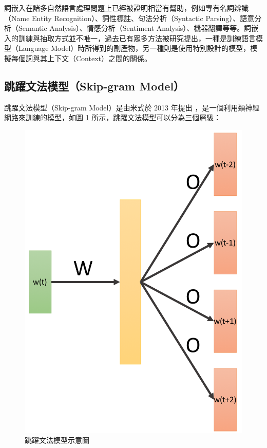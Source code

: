 詞嵌入在諸多自然語言處理問題上已經被證明相當有幫助，例如專有名詞辨識（Name Entity Recognition）、詞性標註、句法分析（Syntactic Parsing）、語意分析（Semantic Analysis）、情感分析（Sentiment Analysis）、機器翻譯等等。詞嵌入的訓練與抽取方式並不唯一，過去已有眾多方法被研究提出，一種是訓練語言模型（Language Model）時所得到的副產物，另一種則是使用特別設計的模型，模擬每個詞與其上下文（Context）之間的關係。%
\subsection{跳躍文法模型（Skip-gram Model）}
跳躍文法模型（Skip-gram Model）是由米式於 2013 年提出 \cite{mikolov2013efficient} \cite{mikolov2013distributed} ，是一個利用類神經網路來訓練的模型，如圖 \ref{fig:skip_gram} 所示，跳躍文法模型可以分為三個層級：
\begin{figure}[h]
    \centering
    \includegraphics[scale=0.35]{images/chap2_skipgram.png}
    \caption{跳躍文法模型示意圖 \cite{shen2016} }\label{fig:skip_gram}
\end{figure}
